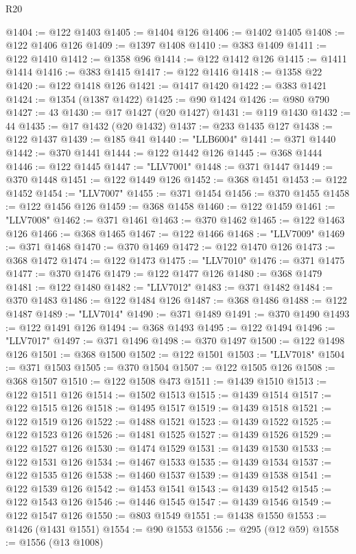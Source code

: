 \begin{lexlean}{R20}
\begin{coremodule}
@1404 := @122 @1403
@1405 := @1404 @126
@1406 := @1402 @1405
@1408 := @122 @1406 @126
@1409 := @1397 @1408
@1410 := @383 @1409
@1411 := @122 @1410
@1412 := @1358 @96
@1414 := @122 @1412 @126
@1415 := @1411 @1414
@1416 := @383 @1415
@1417 := @122 @1416
@1418 := @1358 @22
@1420 := @122 @1418 @126
@1421 := @1417 @1420
@1422 := @383 @1421
@1424 := @1354 (@1387 @1422)
@1425 := @90 @1424
@1426 := @980 @790
@1427 := 43
@1430 := @17 @1427 (@20 @1427)
@1431 := @119 @1430
@1432 := 44
@1435 := @17 @1432 (@20 @1432)
@1437 := @233 @1435 @127
@1438 := @122 @1437
@1439 := @185 @41
@1440 := "LLB6004"
@1441 := @371 @1440
@1442 := @370 @1441
@1444 := @122 @1442 @126
@1445 := @368 @1444
@1446 := @122 @1445
@1447 := "LLV7001"
@1448 := @371 @1447
@1449 := @370 @1448
@1451 := @122 @1449 @126
@1452 := @368 @1451
@1453 := @122 @1452
@1454 := "LLV7007"
@1455 := @371 @1454
@1456 := @370 @1455
@1458 := @122 @1456 @126
@1459 := @368 @1458
@1460 := @122 @1459
@1461 := "LLV7008"
@1462 := @371 @1461
@1463 := @370 @1462
@1465 := @122 @1463 @126
@1466 := @368 @1465
@1467 := @122 @1466
@1468 := "LLV7009"
@1469 := @371 @1468
@1470 := @370 @1469
@1472 := @122 @1470 @126
@1473 := @368 @1472
@1474 := @122 @1473
@1475 := "LLV7010"
@1476 := @371 @1475
@1477 := @370 @1476
@1479 := @122 @1477 @126
@1480 := @368 @1479
@1481 := @122 @1480
@1482 := "LLV7012"
@1483 := @371 @1482
@1484 := @370 @1483
@1486 := @122 @1484 @126
@1487 := @368 @1486
@1488 := @122 @1487
@1489 := "LLV7014"
@1490 := @371 @1489
@1491 := @370 @1490
@1493 := @122 @1491 @126
@1494 := @368 @1493
@1495 := @122 @1494
@1496 := "LLV7017"
@1497 := @371 @1496
@1498 := @370 @1497
@1500 := @122 @1498 @126
@1501 := @368 @1500
@1502 := @122 @1501
@1503 := "LLV7018"
@1504 := @371 @1503
@1505 := @370 @1504
@1507 := @122 @1505 @126
@1508 := @368 @1507
@1510 := @122 @1508 @473
@1511 := @1439 @1510
@1513 := @122 @1511 @126
@1514 := @1502 @1513
@1515 := @1439 @1514
@1517 := @122 @1515 @126
@1518 := @1495 @1517
@1519 := @1439 @1518
@1521 := @122 @1519 @126
@1522 := @1488 @1521
@1523 := @1439 @1522
@1525 := @122 @1523 @126
@1526 := @1481 @1525
@1527 := @1439 @1526
@1529 := @122 @1527 @126
@1530 := @1474 @1529
@1531 := @1439 @1530
@1533 := @122 @1531 @126
@1534 := @1467 @1533
@1535 := @1439 @1534
@1537 := @122 @1535 @126
@1538 := @1460 @1537
@1539 := @1439 @1538
@1541 := @122 @1539 @126
@1542 := @1453 @1541
@1543 := @1439 @1542
@1545 := @122 @1543 @126
@1546 := @1446 @1545
@1547 := @1439 @1546
@1549 := @122 @1547 @126
@1550 := @803 @1549
@1551 := @1438 @1550
@1553 := @1426 (@1431 @1551)
@1554 := @90 @1553
@1556 := @295 (@12 @59)
@1558 := @1556 (@13 @1008)

\end{coremodule}
\end{lexlean}
